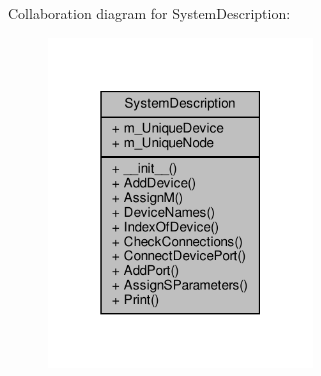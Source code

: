 Collaboration diagram for System\+Description\+:
\nopagebreak
\begin{figure}[H]
\begin{center}
\leavevmode
\includegraphics[width=199pt]{classSignalIntegrity_1_1SystemDescriptions_1_1SystemDescription_1_1SystemDescription__coll__graph}
\end{center}
\end{figure}
